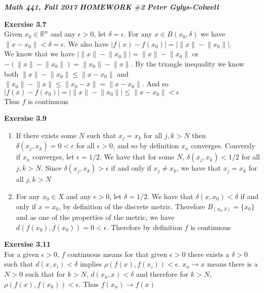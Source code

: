 \documentclass[12pt]{article}
\newenvironment{ques}[1]{\textbf{Exersise #1}\vspace{1 mm}\\ }{\bigskip}
\theoremstyle{definition}
\begin{document}
\noindent \textit{\textbf{Math 441, Fall 2017}} \hspace{1.3cm}
\textit{\textbf{HOMEWORK $\#$2}} \hspace{1.3cm} \textit{\textbf{Peter
Gylys-Colwell}} 

\vspace{1cm}

\begin{ques}{3.7}
	Given $x_0 \in \mathbb R^n$ and any $\epsilon > 0$, let $\delta =
	\epsilon$. For any $x \in B(x_0, \delta)$ we have $\lVert x
	- x_0 \rVert < \delta = \epsilon$. We also have $| f(x) - f(x_0)
	|= | \lVert x \rVert - \lVert x_0 \rVert |$. \\
	We know that we have $| \lVert x \rVert - \lVert x_0 \rVert | = \lVert
	x \rVert - \lVert x_0 \rVert$ or $-(\lVert x \rVert - \lVert x_0
	\rVert) = \lVert x_0 \rVert - \lVert x \rVert$. By the triangle
	inequality we know both $\lVert x \rVert - \lVert x_0 \rVert \leq \lVert x -
	x_0 \rVert$ and $\lVert x_0 \rVert - \lVert x \rVert \leq \lVert x_0 -
	x \rVert = \lVert x - x_0 \rVert$. And so $| f(x) - f(x_0)| = | \lVert
	x \rVert - \lVert x_0 \rVert | \leq \lVert x - x_0 \rVert < \epsilon$\\
	Thus $f$ is continuous
\end{ques}

\begin{ques}{3.9}
	\begin{enumerate}
		\item
			If there exists some $N$ such that $x_j = x_k$ for all
			$j,k > N$ then $\delta(x_j, x_k) = 0 < \epsilon$ for
			all $\epsilon > 0$, and so by definition $x_n$
			converges. Conversly if $x_n$ converges, let $\epsilon
			= 1/2$. We have that for some $N$, $\delta(x_j,x_k) <
			1/2$ for all $j,k > N$. Since $\delta(x_j,x_k) >
			\epsilon$ if and only if $x_j \neq x_k$, we have that
			$x_j = x_k$ for all $j,k > N$
		\item
			For any $x_0 \in X$ and any $\epsilon > 0$, let $\delta
			= 1/2$. We have that $\delta(x,x_0) < \delta$ if and
			only if $x = x_0$, by definition of the discrete
			metric. Therefore $B_(x_0,\delta) = \{ x_0\}$ and as
			one of the properties of the metric, we have $d(f(x_0),
			f(x_0)) = 0 < \epsilon$. Therefore by definition $f$ is continuous
	\end{enumerate}
\end{ques}

\begin{ques}{3.11}
	For a given $\epsilon > 0$, $f$ continuous means for that given $\epsilon > 0$
	there exists a $\delta > 0 $ such that $d(x,x_i) < \delta$ implies $\rho
	(f(x) , f(x_i)) < \epsilon$. $x_n \to x$ means there is a $N > 0$ such
	that for $k > N$, $d(x_k,x) < \delta$ and therefore for $k > N$, $\rho
	(f(x) , f(x_k)) < \epsilon$. Thus $f(x_n) \to f(x)$
\end{ques}
\end{document}
